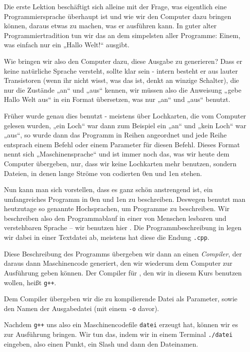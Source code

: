 
Die erste Lektion beschäftigt sich alleine mit der Frage, was eigentlich eine
Programmiersprache überhaupt ist und wie wir den Computer dazu bringen können,
daraus etwas zu machen, was er ausführen kann.  In guter alter
Programmiertradition tun wir das an dem simpelsten aller Programme: Einem, was
einfach nur ein „Hallo Welt!“ ausgibt.

Wie bringen wir also den Computer dazu, diese Ausgabe zu generieren? Dass er
keine natürliche Sprache versteht, sollte klar sein - intern besteht er aus
lauter Transistoren (wenn ihr nicht wisst, was das ist, denkt an winzige
Schalter), die nur die Zustände „an“ und „aus“ kennen, wir müssen also die
Anweisung „gebe Hallo Welt aus“ in ein Format übersetzen, was nur „an“ und
„aus“ benutzt.

Früher wurde genau dies benutzt - meistens über Lochkarten, die vom Computer
gelesen wurden, „ein Loch“ war dann zum Beispiel ein „an“ und „kein Loch“ war
„aus“, so wurde dann das Programm in Reihen angeordnet und jede Reihe entsprach
einem Befehl oder einem Parameter für diesen Befehl.  Dieses Format nennt sich
„Maschinensprache“ und ist immer noch das, was wir heute dem Computer
übergeben, nur, dass wir keine Lochkarten mehr benutzen, sondern Dateien, in
denen lange Ströme von codierten 0en und 1en stehen.

Nun kann man sich vorstellen, dass es ganz schön anstrengend ist, ein
umfangreiches Programm in 0en und 1en zu beschreiben. Deswegen benutzt man
heutzutage so genannte Hochsprachen, um Programme zu beschreiben. Wir
beschreiben also den Programmablauf in einer von Menschen lesbaren und
verstehbaren Sprache -- wir benutzen hier \Cpp.  Die Programmbeschreibung in
\Cpp legen wir dabei in einer Textdatei ab, meistens hat diese die Endung
\texttt{.cpp}.

Diese Beschreibung des Programms übergeben wir dann an einen \emph{Compiler},
der daraus dann Maschinencode generiert, den wir wiederum dem Computer zur
Ausführung geben können.  Der Compiler für \Cpp, den wir in diesem Kurs
benutzen wollen, heißt \texttt{g++}.

Dem Compiler übergeben wir die zu kompilierende Datei als Parameter, sowie den
Namen der Ausgabedatei (mit einem \texttt{-o} davor).

Nachdem \texttt{g++} uns also ein Maschinencodefile \texttt{datei} erzeugt hat,
können wir es zur Ausführung bringen. Wir tun das, indem wir in einem Terminal
\texttt{./datei} eingeben, also einen Punkt, ein Slash und dann den Dateinamen.


